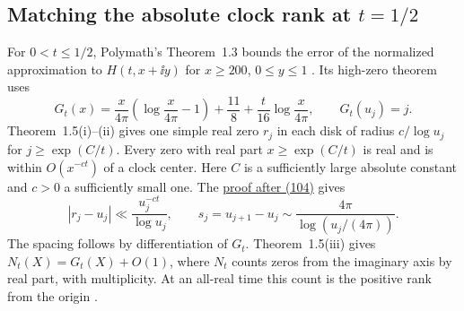 \subsection{Matching the absolute clock rank at \texorpdfstring{\(t=1/2\)}{t=1/2}}

For \(0<t\le1/2\), Polymath's Theorem~1.3 bounds the error of
the normalized approximation to \(H(t,x+\ii y)\) for \(x\ge200\),
\(0\le y\le1\) \cite{Polymath2019}. Its high-zero theorem uses
\[
 G_t(x)=\frac{x}{4\pi}\left(\log\frac{x}{4\pi}-1\right)
           +\frac{11}{8}+\frac{t}{16}\log\frac{x}{4\pi},
 \qquad G_t(u_j)=j .
\]
Theorem~1.5(i)--(ii) gives one simple real zero \(r_j\) in each
disk of radius \(c/\log u_j\) for \(j\ge\exp(C/t)\). Every zero
with real part \(x\ge\exp(C/t)\) is real and is within
\(O(x^{-ct})\) of a clock center.
Here \(C\) is a sufficiently large absolute constant and
\(c>0\) a sufficiently small one.
The \href{https://arxiv.org/html/1904.12438v2\#S9.E104}{proof after (104)} gives
\begin{equation}\label{eq:clock-error}
 |r_j-u_j|\ll\frac{u_j^{-ct}}{\log u_j},\qquad
 s_j=u_{j+1}-u_j\sim\frac{4\pi}{\log(u_j/(4\pi))}.
\end{equation}
The spacing follows by differentiation of \(G_t\). Theorem~1.5(iii)
gives \(N_t(X)=G_t(X)+O(1)\), where \(N_t\) counts zeros from the
imaginary axis by real part, with multiplicity. At an all-real
time this count is the positive rank from the origin
\cite[Theorem~1.5 and \S9]{Polymath2019}.

